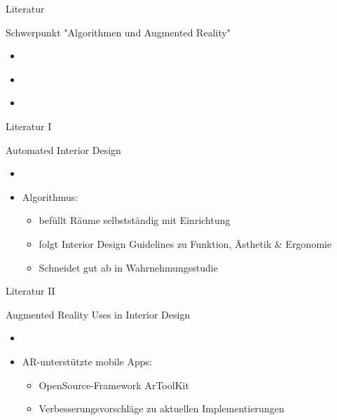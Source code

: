 \documentclass[presentation,bigger,aspectratio=169]{beamer}
\begin{document}
\begin{frame}[label={sec:org58cfda4}]{Literatur}
\begin{block}{Schwerpunkt "Algorithmen und Augmented Reality"}
\begin{itemize}
\item \textcite{kanAutomatedInteriorDesign2017}
\item \textcite{sanduAugmentedRealityUses2018}
\item \textcite{moaresInterARInterior2020}
\end{itemize}
\end{block}
\end{frame}

\begin{frame}[label={sec:org4af0d04}]{Literatur I}
\begin{block}{Automated Interior Design}
\begin{itemize}
\item \textcite{kanAutomatedInteriorDesign2017}
\item Algorithmus:
\begin{itemize}
\item befüllt Räume selbstständig mit Einrichtung
\item folgt Interior Design Guidelines zu Funktion, Ästhetik \& Ergonomie
\item Schneidet gut ab in Wahrnehmungsstudie
\end{itemize}
\end{itemize}
\end{block}
\end{frame}

\begin{frame}[label={sec:org7e19996}]{Literatur II}
\begin{block}{Augmented Reality Uses in Interior Design}
\begin{itemize}
\item \textcite{sanduAugmentedRealityUses2018}
\item AR-unterstützte mobile Apps:
\begin{itemize}
\item OpenSource-Framework ArToolKit
\item Verbesserungsvorschläge zu aktuellen Implementierungen
\end{itemize}
\end{itemize}
\end{block}
\end{frame}
\end{document}
